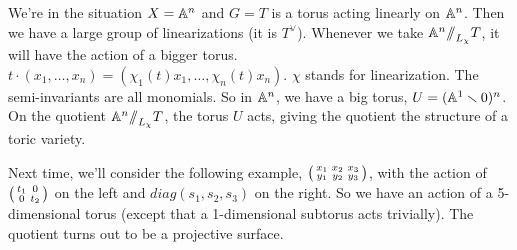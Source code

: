 
We're in the situation $X=\AA^n$ and $G=T$ is a torus acting linearly on $\AA^n$. Then we have a large group of linearizations (it is $T^\vee$). Whenever we take $\AA^n\quot_{L_\chi} T$, it will have the action of a bigger torus. $t\cdot (x_1,\dots, x_n)=(\chi_1(t)x_1,\dots, \chi_n(t)x_n)$. $\chi$ stands for linearization. The semi-invariants are all monomials. So in $\AA^n$, we have a big torus, $U=(\AA^1\setminus 0)^n$. On the quotient $\AA^n\quot_{L_\chi}T$, the torus $U$ acts, giving the quotient the structure of a toric variety.

Next time, we'll consider the following example, $\matx{x_1& x_2& x_3\\ y_1& y_2& y_3}$, with the action of $\matx{t_1&0\\ 0&t_2}$ on the left and $diag(s_1,s_2,s_3)$ on the right. So we have an action of a 5-dimensional torus (except that a 1-dimensional subtorus acts trivially). The quotient turns out to be a projective surface.